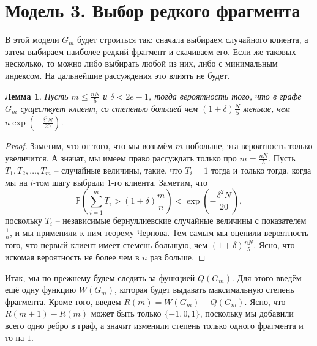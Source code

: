 \documentclass{matmex-diploma-custom}
\newcommand{\PRob}{\mathbb P}
\newcommand{\leqs}{\leqslant}
\newtheorem{lemma}{Лемма}
\theoremstyle{named}
\begin{document}
\section*{Модель 3. Выбор редкого фрагмента}

В этой модели $G_m$ будет строиться так: сначала выбираем случайного клиента, а затем выбираем наиболее редкий фрагмент и скачиваем его.
Если же таковых несколько, то можно либо выбирать любой из них, либо с минимальным индексом. 
На дальнейшие рассуждения это влиять не будет.

\begin{lemma}\label{l4}
Пусть $m \leqs \frac{nN}{5}$ и $\delta < 2e - 1$, тогда вероятность того, что в графе $G_m$ существует клиент, 
со степенью большей чем $(1+\delta)\frac{N}{5}$ меньше, чем $n \exp\left(- \frac{\delta^2 N}{20}\right)$.
\end{lemma}
\begin{proof}
Заметим, что от того, что мы возьмём $m$ побольше, эта вероятность только увеличится. 
А значат, мы имеем право рассуждать только про $m = \frac{nN}{5}$. 
Пусть $T_1, T_2, \dots, T_m$ -- случайные величины, такие, что $T_i = 1$ тогда и только тогда, 
когда мы на $i$-том шагу выбрали $1$-го клиента.
Заметим, что 
\begin{equation}
\PRob\left(\sum_{i = 1}^m T_i > (1+\delta)\frac{m}{n} \right) < \exp\left(- \frac{\delta^2 N}{20} \right),
\end{equation}
поскольку $T_i$ -- независимые бернуллиевские случайные величины с показателем $\frac{1}{n}$, и мы применили к ним теорему Чернова.
Тем самым мы оценили вероятность того, что первый клиент имеет стемень большую, чем $(1+\delta)\frac{nN}{5}$.
Ясно, что искомая вероятность не более чем в $n$ раз больше.
\end{proof}

Итак, мы по прежнему будем следить за функцией $Q(G_m)$. Для этого введём ещё одну функцию $W(G_m)$, 
которая будет выдавать максимальную степень фрагмента.
Кроме того, введем $R(m) = W(G_m) - Q(G_m)$. 
Ясно, что $R(m+1) - R(m)$ может быть только $\{-1,0,1\}$, поскольку мы добавили всего одно ребро в граф, 
а значит изменили степень только одного фрагмента и то на $1$. 
\end{document}
